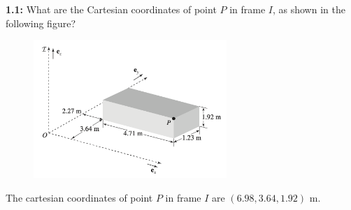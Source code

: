  

%
%

\newcommand{\hmwkTitle}{Homework 01}
\newcommand{\hmwkDueDate}{September 06, 2024}
\newcommand{\hmwkDueTime}{01:00 PM}
\newcommand{\hmwkClass}{ENAE 301}
\newcommand{\hmwkClassTime}{Section 0103}
\newcommand{\hmwkClassInstructor}{Dr. Paley}
\newcommand{\hmwkAuthorName}{\textbf{Vai Srivastava}}



\maketitle

\pagebreak

\begin{homeworkProblem}

	\textbf{1.1:} What are the Cartesian coordinates of point \( P \) in frame \( I \), as shown in the following figure?

	\begin{figure}[ht]
		\begin{center}
			\includegraphics[width=0.65\textwidth]{images/01-1.1.png}
		\end{center}
	\end{figure}

	\solution

	The cartesian coordinates of point \( P \) in frame \( I \) are \( \left(6.98, 3.64, 1.92\right) \) m.

\end{homeworkProblem}

